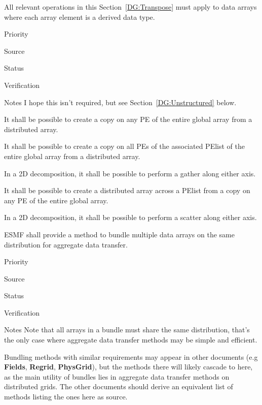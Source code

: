 
All relevant operations in this Section~\ref{DG:Transpose} must apply to
data arrays where each array element is a derived data type.

\begin{reqlist}
\item[Priority]
\item[Source]
\item[Status]
\item[Verification]
\item[Notes] I hope this isn't required, but see
  Section~\ref{DG:Unstructured} below.
\end{reqlist}


It shall be possible to create a copy on any PE of the entire global
array from a distributed array.


It shall be possible to create a copy on all PEs of the associated
PElist of the entire global array from a distributed array.

 \label{DG:PartGather}

In a 2D decomposition, it shall be possible to perform a gather along
either axis.


It shall be possible to create a distributed array across a PElist
from a copy on any PE of the entire global array.


In a 2D decomposition, it shall be possible to perform a scatter along
either axis.


ESMF shall provide a method to bundle multiple data arrays on the same
distribution for aggregate data transfer.

\begin{reqlist}
\item[Priority]
\item[Source]
\item[Status]
\item[Verification]
\item[Notes] Note that all arrays in a bundle must share the same
  distribution, that's the only case where aggregate data transfer
  methods may be simple and efficient.
  
  Bundling methods with similar requirements may appear in other
  documents (e.g \textbf{Fields}, \textbf{Regrid}, \textbf{PhysGrid}),
  but the methods there will likely cascade to here, as the main
  utility of bundles lies in aggregate data transfer methods on
  distributed grids. The other documents should derive an equivalent
  list of methods listing the ones here as source.
\end{reqlist}

